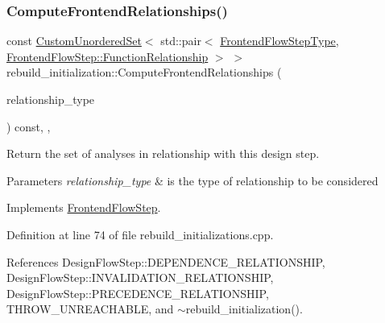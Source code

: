 \subsubsection{\texorpdfstring{Compute\+Frontend\+Relationships()}{ComputeFrontendRelationships()}}
{\footnotesize\ttfamily const \hyperlink{classCustomUnorderedSet}{Custom\+Unordered\+Set}$<$ std\+::pair$<$ \hyperlink{frontend__flow__step_8hpp_afeb3716c693d2b2e4ed3e6d04c3b63bb}{Frontend\+Flow\+Step\+Type}, \hyperlink{classFrontendFlowStep_af7cf30f2023e5b99e637dc2058289ab0}{Frontend\+Flow\+Step\+::\+Function\+Relationship} $>$ $>$ rebuild\+\_\+initialization\+::\+Compute\+Frontend\+Relationships (\begin{DoxyParamCaption}\item[{const \hyperlink{classDesignFlowStep_a723a3baf19ff2ceb77bc13e099d0b1b7}{Design\+Flow\+Step\+::\+Relationship\+Type}}]{relationship\+\_\+type }\end{DoxyParamCaption}) const\hspace{0.3cm}{\ttfamily [override]}, {\ttfamily [private]}, {\ttfamily [virtual]}}



Return the set of analyses in relationship with this design step. 


\begin{DoxyParams}{Parameters}
{\em relationship\+\_\+type} & is the type of relationship to be considered \\
\hline
\end{DoxyParams}


Implements \hyperlink{classFrontendFlowStep_abeaff70b59734e462d347ed343dd700d}{Frontend\+Flow\+Step}.



Definition at line 74 of file rebuild\+\_\+initializations.\+cpp.



References Design\+Flow\+Step\+::\+D\+E\+P\+E\+N\+D\+E\+N\+C\+E\+\_\+\+R\+E\+L\+A\+T\+I\+O\+N\+S\+H\+IP, Design\+Flow\+Step\+::\+I\+N\+V\+A\+L\+I\+D\+A\+T\+I\+O\+N\+\_\+\+R\+E\+L\+A\+T\+I\+O\+N\+S\+H\+IP, Design\+Flow\+Step\+::\+P\+R\+E\+C\+E\+D\+E\+N\+C\+E\+\_\+\+R\+E\+L\+A\+T\+I\+O\+N\+S\+H\+IP, T\+H\+R\+O\+W\+\_\+\+U\+N\+R\+E\+A\+C\+H\+A\+B\+LE, and $\sim$rebuild\+\_\+initialization().


